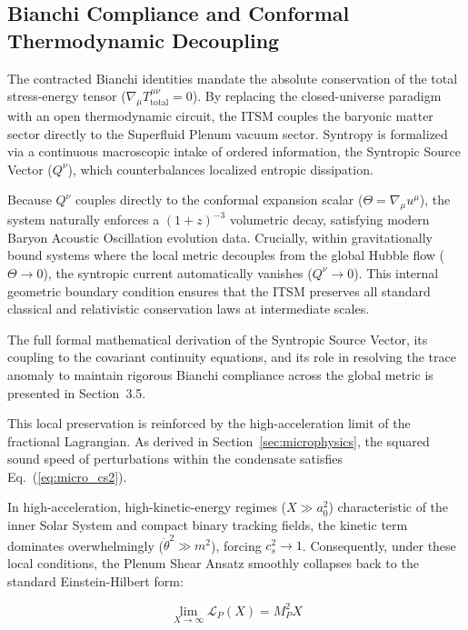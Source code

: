 \documentclass[aps,prd,10pt,twocolumn,superscriptaddress,nofootinbib,floatfix]{revtex4-2}
\begin{document}
\subsection{\label{sec:bianchi}Bianchi Compliance and Conformal Thermodynamic Decoupling}

The contracted Bianchi identities mandate the absolute conservation of the total stress-energy tensor ($\nabla_\mu T_{\text{total}}^{\mu\nu} = 0$). By replacing the closed-universe paradigm with an open thermodynamic circuit, the ITSM couples the baryonic matter sector directly to the Superfluid Plenum vacuum sector. Syntropy is formalized via a continuous macroscopic intake of ordered information, the Syntropic Source Vector ($Q^\nu$), which counterbalances localized entropic dissipation. 

Because $Q^\nu$ couples directly to the conformal expansion scalar ($\Theta = \nabla_\mu u^\mu$), the system naturally enforces a $(1+z)^{-3}$ volumetric decay, satisfying modern Baryon Acoustic Oscillation evolution data. Crucially, within gravitationally bound systems where the local metric decouples from the global Hubble flow ($\Theta \to 0$), the syntropic current automatically vanishes ($Q^\nu \to 0$). This internal geometric boundary condition ensures that the ITSM preserves all standard classical and relativistic conservation laws at intermediate scales.

The full formal mathematical derivation of the Syntropic Source Vector, its coupling to the covariant continuity equations, and its role in resolving the trace anomaly to maintain rigorous Bianchi compliance across the global metric is presented in Section~3.5.

This local preservation is reinforced by the high-acceleration limit of the fractional Lagrangian. As derived in Section~\ref{sec:microphysics}, the squared sound speed of perturbations within the condensate satisfies Eq.~(\ref{eq:micro_cs2}).

In high-acceleration, high-kinetic-energy regimes ($X \gg a_0^2$) characteristic of the inner Solar System and compact binary tracking fields, the kinetic term dominates overwhelmingly ($\dot{\theta}^2 \gg m^2$), forcing $c_s^2 \to 1$. Consequently, under these local conditions, the Plenum Shear Ansatz smoothly collapses back to the standard Einstein-Hilbert form:

\begin{equation}
\lim_{X \to \infty} \mathcal{L}_P(X) = M_P^2 X
\end{equation}
\end{document}
